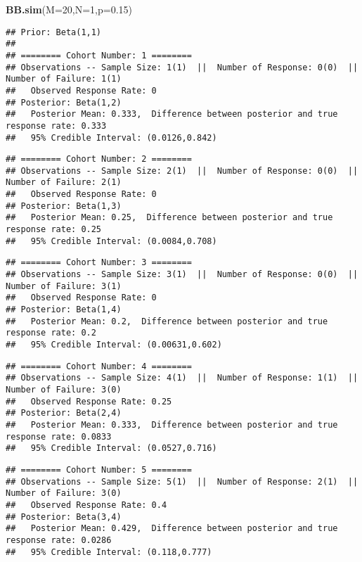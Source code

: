 \documentclass[]{article}
\newenvironment{Shaded}{\begin{snugshade}}{\end{snugshade}}
\newcommand{\KeywordTok}[1]{\textcolor[rgb]{0.13,0.29,0.53}{\textbf{{#1}}}}
\newcommand{\DataTypeTok}[1]{\textcolor[rgb]{0.13,0.29,0.53}{{#1}}}
\newcommand{\DecValTok}[1]{\textcolor[rgb]{0.00,0.00,0.81}{{#1}}}
\newcommand{\FloatTok}[1]{\textcolor[rgb]{0.00,0.00,0.81}{{#1}}}
\newcommand{\NormalTok}[1]{{#1}}
\begin{document}
\begin{Shaded}
\begin{Highlighting}[]
\KeywordTok{BB.sim}\NormalTok{(}\DataTypeTok{M=}\DecValTok{20}\NormalTok{,}\DataTypeTok{N=}\DecValTok{1}\NormalTok{,}\DataTypeTok{p=}\FloatTok{0.15}\NormalTok{)}
\end{Highlighting}
\end{Shaded}

\begin{verbatim}
## Prior: Beta(1,1) 
## 
## ======== Cohort Number: 1 ======== 
## Observations -- Sample Size: 1(1)  ||  Number of Response: 0(0)  ||  Number of Failure: 1(1)
##   Observed Response Rate: 0
## Posterior: Beta(1,2) 
##   Posterior Mean: 0.333,  Difference between posterior and true response rate: 0.333
##   95% Credible Interval: (0.0126,0.842)
\end{verbatim}

\begin{verbatim}
## ======== Cohort Number: 2 ======== 
## Observations -- Sample Size: 2(1)  ||  Number of Response: 0(0)  ||  Number of Failure: 2(1)
##   Observed Response Rate: 0
## Posterior: Beta(1,3) 
##   Posterior Mean: 0.25,  Difference between posterior and true response rate: 0.25
##   95% Credible Interval: (0.0084,0.708)
\end{verbatim}

\begin{verbatim}
## ======== Cohort Number: 3 ======== 
## Observations -- Sample Size: 3(1)  ||  Number of Response: 0(0)  ||  Number of Failure: 3(1)
##   Observed Response Rate: 0
## Posterior: Beta(1,4) 
##   Posterior Mean: 0.2,  Difference between posterior and true response rate: 0.2
##   95% Credible Interval: (0.00631,0.602)
\end{verbatim}

\begin{verbatim}
## ======== Cohort Number: 4 ======== 
## Observations -- Sample Size: 4(1)  ||  Number of Response: 1(1)  ||  Number of Failure: 3(0)
##   Observed Response Rate: 0.25
## Posterior: Beta(2,4) 
##   Posterior Mean: 0.333,  Difference between posterior and true response rate: 0.0833
##   95% Credible Interval: (0.0527,0.716)
\end{verbatim}

\begin{verbatim}
## ======== Cohort Number: 5 ======== 
## Observations -- Sample Size: 5(1)  ||  Number of Response: 2(1)  ||  Number of Failure: 3(0)
##   Observed Response Rate: 0.4
## Posterior: Beta(3,4) 
##   Posterior Mean: 0.429,  Difference between posterior and true response rate: 0.0286
##   95% Credible Interval: (0.118,0.777)
\end{verbatim}
\end{document}
